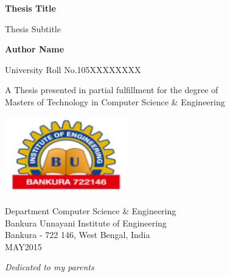 \documentclass[12pt]{report}
\begin{document}
\begin{titlepage}
    \begin{center}
        \vspace*{1cm}
        \Huge
        \textbf{Thesis Title}
        
        \vspace{0.5cm}
        \LARGE
        Thesis Subtitle
        
        \vspace{1.5cm}
        
        \textbf{Author Name}
         
         University Roll No.105XXXXXXXX          
        
        \vfill
        
        A Thesis presented in partial fulfillment for the degree of\\
        Masters of Technology in Computer Science \& Engineering
        
        \vspace{0.8cm}
        
        \includegraphics[width=0.4\textwidth]{buie_logo.jpg}
        
        Department Computer Science \& Engineering\\
        Bankura Unnayani Institute of Engineering\\
        Bankura - 722 146, West Bengal, India\\
       
       {MAY}{\hspace*{0.5cm}}{2015}
        
    \end{center}
\end{titlepage}
\newpage


\begin{center}
\vspace*{8.5cm}
\LARGE
\textit{Dedicated to my parents}

\end{center}
\end{document}
